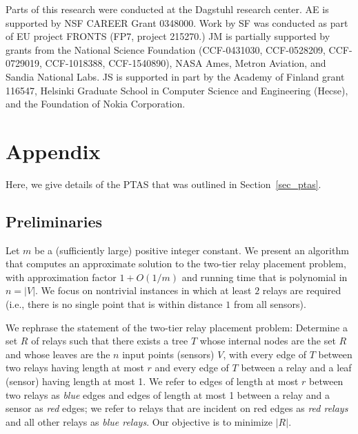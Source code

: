 \documentclass[11pt,a4paper]{article}
\newcommand{\s}[1]{{\lvert #1 \rvert}}
\theoremstyle{definition}
\theoremstyle{remark}
\begin{document}
Parts of this research were conducted at the Dagstuhl research center. AE is supported by NSF CAREER Grant 0348000. Work by SF was conducted as part of EU project  FRONTS (FP7, project 215270.)   JM is partially supported by grants from the National Science Foundation (CCF-0431030, CCF-0528209, CCF-0729019, CCF-1018388, CCF-1540890), NASA Ames, Metron Aviation, and Sandia National Labs.  JS is supported in part by the Academy of Finland grant 116547,  Helsinki Graduate School in Computer Science and Engineering (Hecse), and the Foundation of Nokia Corporation.  




\newpage
\appendix
\section{Appendix}

Here, we give details of the PTAS that was outlined in Section~\ref{sec_ptas}.

\subsection{Preliminaries}

Let $m$ be a (sufficiently large) positive integer constant. We present an algorithm that computes an approximate solution to the two-tier relay placement problem, with approximation factor $1+O(1/m)$ and running time that is polynomial in $n = \s{V}$. We focus on nontrivial instances in which at least $2$ relays are required (i.e., there is no single point that is within distance $1$ from all sensors).

We rephrase the statement of the two-tier relay placement problem:
Determine a set $R$ of relays such that there exists a tree $T$ whose
internal nodes are the set $R$ and whose leaves are the $n$ input
points (sensors) $V$, with every edge of $T$ between two relays having
length at most $r$ and every edge of $T$ between a relay and a leaf
(sensor) having length at most 1.  We refer to edges of length at most
$r$ between two relays as {\em blue} edges and edges of length at most
1 between a relay and a sensor as {\em red} edges; we refer to relays
that are incident on red edges as {\em red relays} and all other
relays as {\em blue relays}.  Our objective is to minimize $\s{R}$.
\end{document}
